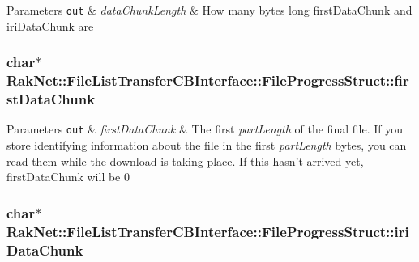 \begin{DoxyParams}[1]{Parameters}
\mbox{\tt out}  & {\em data\-Chunk\-Length} & How many bytes long first\-Data\-Chunk and iri\-Data\-Chunk are \\
\hline
\end{DoxyParams}
\hypertarget{struct_rak_net_1_1_file_list_transfer_c_b_interface_1_1_file_progress_struct_a46afac08532c8f81e142a124df87e39f}{
\subsubsection[{first\-Data\-Chunk}]{\setlength{\rightskip}{0pt plus 5cm}char$\ast$ Rak\-Net\-::\-File\-List\-Transfer\-C\-B\-Interface\-::\-File\-Progress\-Struct\-::first\-Data\-Chunk}}\label{struct_rak_net_1_1_file_list_transfer_c_b_interface_1_1_file_progress_struct_a46afac08532c8f81e142a124df87e39f}

\begin{DoxyParams}[1]{Parameters}
\mbox{\tt out}  & {\em first\-Data\-Chunk} & The first {\itshape part\-Length} of the final file. If you store identifying information about the file in the first {\itshape part\-Length} bytes, you can read them while the download is taking place. If this hasn't arrived yet, first\-Data\-Chunk will be 0 \\
\hline
\end{DoxyParams}
\hypertarget{struct_rak_net_1_1_file_list_transfer_c_b_interface_1_1_file_progress_struct_ab113ec6be9d48acd86f889d316cca04f}{
\subsubsection[{iri\-Data\-Chunk}]{\setlength{\rightskip}{0pt plus 5cm}char$\ast$ Rak\-Net\-::\-File\-List\-Transfer\-C\-B\-Interface\-::\-File\-Progress\-Struct\-::iri\-Data\-Chunk}}\label{struct_rak_net_1_1_file_list_transfer_c_b_interface_1_1_file_progress_struct_ab113ec6be9d48acd86f889d316cca04f}

